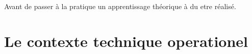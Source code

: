 


Avant de passer à la pratique un apprentissage théorique à du etre réalisé.

\section{Le contexte technique operationel}

